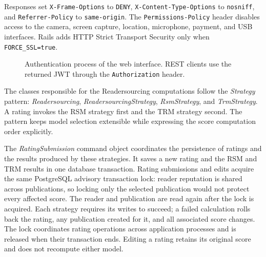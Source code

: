 \documentclass[a4paper, english]{article}
\begin{document}
Responses set \verb|X-Frame-Options| to \verb|DENY|, \verb|X-Content-Type-Options| to \verb|nosniff|, and \verb|Referrer-Policy| to \verb|same-origin|. The \verb|Permissions-Policy| header disables access to the camera, screen capture, location, microphone, payment, and USB interfaces. Rails adds HTTP Strict Transport Security only when \verb|FORCE_SSL=true|.

\begin{figure}[H]
\centering
{}
\caption{Authentication process of the web interface. REST clients use the returned JWT through the \texttt{Authorization} header.}
\label{fig:auth}
\end{figure}

The classes responsible for the Readersourcing computations follow the \emph{Strategy} pattern: \emph{Readersourcing}, \emph{ReadersourcingStrategy}, \emph{RsmStrategy}, and \emph{TrmStrategy}. A rating invokes the RSM strategy first and the TRM strategy second. The pattern keeps model selection extensible while expressing the score computation order explicitly.

The \emph{RatingSubmission} command object coordinates the persistence of ratings and the results produced by these strategies. It saves a new rating and the RSM and TRM results in one database transaction. Rating submissions and edits acquire the same PostgreSQL advisory transaction lock: reader reputation is shared across publications, so locking only the selected publication would not protect every affected score. The reader and publication are read again after the lock is acquired. Each strategy requires its writes to succeed; a failed calculation rolls back the rating, any publication created for it, and all associated score changes. The lock coordinates rating operations across application processes and is released when their transaction ends. Editing a rating retains its original score and does not recompute either model.
\end{document}
